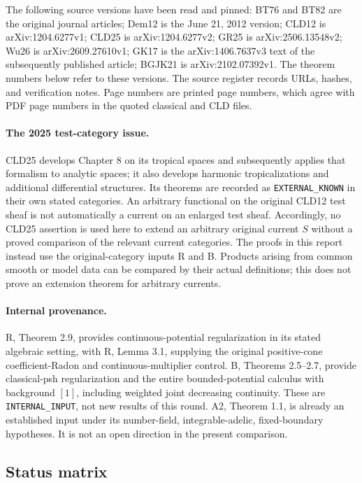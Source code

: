 \documentclass[11pt,a4paper]{article}
\numberwithin{equation}{section}
\theoremstyle{definition}
\theoremstyle{remark}
\begin{document}
The following source versions have been read and pinned: BT76 and BT82 are
the original journal articles; Dem12 is the June 21, 2012 version; CLD12 is
arXiv:1204.6277v1; CLD25 is arXiv:1204.6277v2; GR25 is
arXiv:2506.13548v2; Wu26 is arXiv:2609.27610v1; GK17 is the
arXiv:1406.7637v3 text of the subsequently published article; BGJK21 is
arXiv:2102.07392v1. The theorem numbers below refer to these versions.
The source register records URLs, hashes, and verification notes. Page
numbers are printed page numbers, which agree with PDF page numbers in the
quoted classical and CLD files.

\paragraph{The 2025 test-category issue.}
CLD25 develops Chapter 8 on its tropical spaces and subsequently applies
that formalism to analytic spaces; it also develops harmonic tropicalizations
and additional differential structures. Its theorems are recorded as
\texttt{EXTERNAL\_KNOWN} in their own stated categories. An arbitrary
functional on the original CLD12 test sheaf is not automatically a current
on an enlarged test sheaf. Accordingly, no CLD25 assertion is used here to
extend an arbitrary original current \(S\) without a proved comparison of
the relevant current categories. The proofs in this report instead use the
original-category inputs R and B. Products arising from common smooth or
model data can be compared by their actual definitions; this does not prove
an extension theorem for arbitrary currents.

\paragraph{Internal provenance.}
R, Theorem 2.9, provides continuous-potential regularization in its stated
algebraic setting, with R, Lemma 3.1, supplying the original positive-cone
coefficient-Radon and continuous-multiplier control. B, Theorems 2.5--2.7,
provide classical-psh regularization and the entire bounded-potential
calculus with background \([1]\), including weighted joint decreasing
continuity. These are \texttt{INTERNAL\_INPUT}, not new results of this
round. A2, Theorem 1.1, is already an established input under its number-field,
integrable-adelic, fixed-boundary hypotheses. It is not an open direction in
the present comparison.

\subsection{Status matrix}
\end{document}
